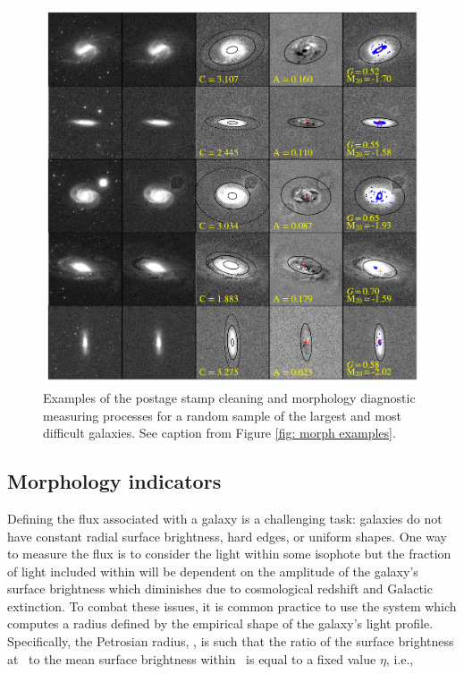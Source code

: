 \begin{figure}
\includegraphics[width=\textwidth]{Figures/measure_morph_hardest.pdf}
\caption[Examples of image cleaning and morphology diagnostic measurements]{Examples of the postage stamp cleaning and morphology diagnostic measuring processes for a random sample of the largest and most difficult galaxies. See caption from Figure \ref{fig: morph examples}.}
\label{fig: morph examples hardest}
\end{figure}


\subsection{Morphology indicators}
Defining the flux associated with a galaxy is a challenging task: galaxies do not have constant radial surface brightness, hard edges, or uniform shapes.  One way to measure the flux is to consider the light within some isophote but the fraction of light included within will be dependent on the amplitude of the galaxy's surface brightness which diminishes due to cosmological redshift and Galactic extinction. To combat these issues, it is common practice to use the \cite{Petrosian1976} system which computes a radius defined by the empirical shape of the galaxy's light profile. Specifically, the Petrosian radius, \rp, is such that the ratio of the surface brightness at \rp~to the mean surface brightness within \rp~is equal to a fixed value $\eta$, i.e., 

